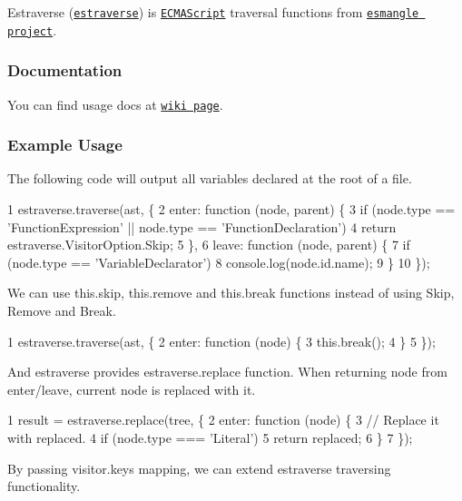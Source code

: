 Estraverse (\href{http://github.com/estools/estraverse}{\tt estraverse}) is \href{http://www.ecma-international.org/publications/standards/Ecma-262.htm}{\tt E\+C\+M\+A\+Script} traversal functions from \href{http://github.com/estools/esmangle}{\tt esmangle project}.

\subsubsection*{Documentation}

You can find usage docs at \href{https://github.com/estools/estraverse/wiki/Usage}{\tt wiki page}.

\subsubsection*{Example Usage}

The following code will output all variables declared at the root of a file.


\begin{DoxyCode}
1 estraverse.traverse(ast, \{
2     enter: function (node, parent) \{
3         if (node.type == 'FunctionExpression' || node.type == 'FunctionDeclaration')
4             return estraverse.VisitorOption.Skip;
5     \},
6     leave: function (node, parent) \{
7         if (node.type == 'VariableDeclarator')
8           console.log(node.id.name);
9     \}
10 \});
\end{DoxyCode}


We can use {\ttfamily this.\+skip}, {\ttfamily this.\+remove} and {\ttfamily this.\+break} functions instead of using Skip, Remove and Break.


\begin{DoxyCode}
1 estraverse.traverse(ast, \{
2     enter: function (node) \{
3         this.break();
4     \}
5 \});
\end{DoxyCode}


And estraverse provides {\ttfamily estraverse.\+replace} function. When returning node from {\ttfamily enter}/{\ttfamily leave}, current node is replaced with it.


\begin{DoxyCode}
1 result = estraverse.replace(tree, \{
2     enter: function (node) \{
3         // Replace it with replaced.
4         if (node.type === 'Literal')
5             return replaced;
6     \}
7 \});
\end{DoxyCode}


By passing {\ttfamily visitor.\+keys} mapping, we can extend estraverse traversing functionality.



